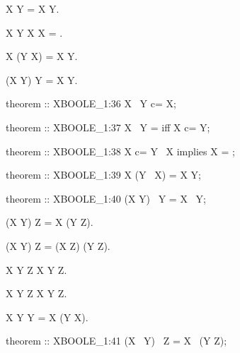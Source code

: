 \begin{paracol}{2}
\begin{theorem}
  X \setminus Y = \emptyset \iff X \subset Y.
\end{theorem}

\begin{theorem}
  X \subset Y \setminus X \implies X = \emptyset.
\end{theorem}

\begin{theorem}
  X \cup (Y \setminus X) = X \cup Y.
\end{theorem}

\begin{theorem}
  (X \cup Y) \setminus Y = X \setminus Y.
\end{theorem}

\switchcolumn

\begin{mizar}
theorem :: XBOOLE_1:36
  X \ Y c= X;

theorem :: XBOOLE_1:37
  X \ Y = {} iff X c= Y;

theorem :: XBOOLE_1:38
  X c= Y \ X implies X = {};

theorem :: XBOOLE_1:39
  X \/ (Y \ X) = X \/ Y;

theorem :: XBOOLE_1:40
  (X \/ Y) \ Y = X \ Y;
\end{mizar}

\switchcolumn*\ensurevspace{5cm}

\begin{theorem}
  (X \setminus Y) \setminus Z = X \setminus (Y \cup Z).
\end{theorem}

\begin{theorem}
  (X \cup Y) \setminus Z = (X \setminus Z) \cup (Y \setminus Z).
\end{theorem}

\begin{theorem}
  X \subset Y \cup Z \implies X \setminus Y \subset Z.
\end{theorem}

\begin{theorem}
  X \setminus Y \subset Z \implies X \subset Y \cup Z.
\end{theorem}

\begin{theorem}
  X \subset Y \implies Y = X \cup (Y \setminus X).
\end{theorem}

\switchcolumn

\begin{mizar}
theorem :: XBOOLE_1:41
  (X \ Y) \ Z = X \ (Y \/ Z);


\end{mizar}
\end{paracol}
